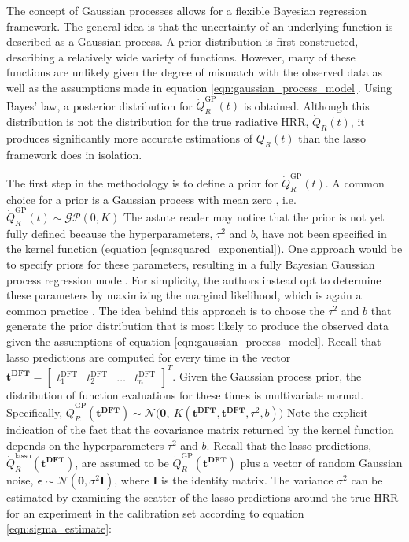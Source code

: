 \documentclass{article}
\begin{document}
The concept of Gaussian processes allows for a flexible Bayesian regression framework. The general idea is that the uncertainty of an underlying function is described as a Gaussian process. A prior distribution is first constructed, describing a relatively wide variety of functions. However, many of these functions are unlikely given the degree of mismatch with the observed data as well as the assumptions made in equation \ref{eqn:gaussian_process_model}. Using Bayes' law, a posterior distribution for  $\dot{Q}_{R}^{\text{GP}}(t)$ is obtained. Although this distribution is not the distribution for the true radiative HRR, $\dot{Q}_{R}(t)$, it produces significantly more accurate estimations of $\dot{Q}_{R}(t)$ than the lasso framework does in isolation. 

The first step in the methodology is to define a prior for $\dot{Q}_{R}^{\text{GP}}(t)$. A common choice for a prior is a Gaussian process with mean zero \cite{rasmussen2003gaussian}, i.e. $\dot{Q}_{R}^{\text{GP}}(t) \sim \mathcal{GP}(0, K)$ The astute reader may notice that the prior is not yet fully defined because the hyperparameters, $\tau^2$ and $b$, have not been specified in the kernel function (equation \ref{eqn:squared_exponential}). One approach would be to specify priors for these parameters, resulting in a fully Bayesian Gaussian process regression model. For simplicity, the authors instead opt to determine these parameters by maximizing the marginal likelihood, which is again a common practice \cite{rasmussen2003gaussian}. The idea behind this approach is to choose the $\tau^2$ and $b$ that generate the prior distribution that is most likely to produce the observed data given the assumptions of equation \ref{eqn:gaussian_process_model}. Recall that lasso predictions are computed for every time in the vector $\boldsymbol{t^{\text{DFT}}} = \begin{bmatrix}  t^{\text{DFT}}_1 & t^{\text{DFT}}_2 & \ldots & t^{\text{DFT}}_n \end{bmatrix}^T$. Given the Gaussian process prior, the distribution of function evaluations for these times is multivariate normal. Specifically,  $\dot{Q}_{R}^{\text{GP}}(\boldsymbol{t^{\text{DFT}}}) \sim \mathcal{N}\Big(\boldsymbol{0}, \  K( \boldsymbol{t^{\text{DFT}}}, \boldsymbol{t^{\text{DFT}}}, \tau^2, b) \Big)$ Note the explicit indication of the fact that the covariance matrix returned by the kernel function depends on the hyperparameters $\tau^2$ and $b$. Recall that the lasso predictions, $\dot{Q}_{R}^{\text{lasso}}(\boldsymbol{t^{\text{DFT}}})$,  are assumed to be $\dot{Q}_{R}^{\text{GP}}(\boldsymbol{t^{\text{DFT}}})$ plus a vector of random Gaussian noise, $\boldsymbol{\epsilon} \sim \mathcal{N}(\boldsymbol{0}, \sigma^2\boldsymbol{I})$, where $\boldsymbol{I}$ is the identity matrix. The variance $\sigma^2$ can be estimated by examining the scatter of the lasso predictions around the true HRR for an experiment in the calibration set according to equation \ref{eqn:sigma_estimate}: 
\end{document}
